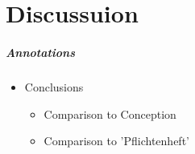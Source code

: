 \chapter{Discussuion}
\label{discussion}

\paragraph{Annotations}

\begin{itemize}
	\item Conclusions
	\begin{itemize}
		\item Comparison to Conception
		\item Comparison to 'Pflichtenheft'
	\end{itemize}
\end{itemize}